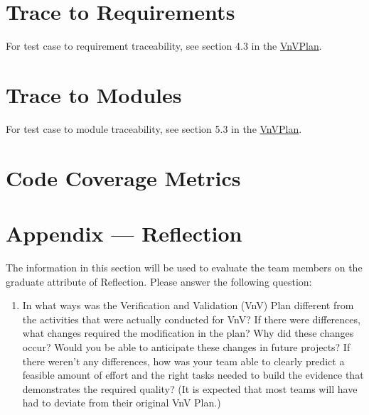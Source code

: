 \documentclass[12pt, titlepage]{article}
\begin{document}
\section{Trace to Requirements}

For test case to requirement traceability, see section 4.3 in the \href{https://github.com/davimang/REACH/blob/main/docs/VnVPlan/VnVPlan.pdf}{VnVPlan}.
\section{Trace to Modules}		
For test case to module traceability, see section 5.3 in the \href{https://github.com/davimang/REACH/blob/main/docs/VnVPlan/VnVPlan.pdf}{VnVPlan}.

\section{Code Coverage Metrics}



%

\newpage{}
\section*{Appendix --- Reflection}

The information in this section will be used to evaluate the team members on the
graduate attribute of Reflection.  Please answer the following question:

\begin{enumerate}
  \item In what ways was the Verification and Validation (VnV) Plan different
  from the activities that were actually conducted for VnV?  If there were
  differences, what changes required the modification in the plan?  Why did
  these changes occur?  Would you be able to anticipate these changes in future
  projects?  If there weren't any differences, how was your team able to clearly
  predict a feasible amount of effort and the right tasks needed to build the
  evidence that demonstrates the required quality?  (It is expected that most
  teams will have had to deviate from their original VnV Plan.)
\end{enumerate}
\end{document}
